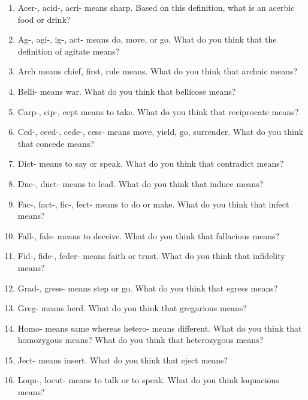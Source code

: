 \documentclass[12pt]{book}
\begin{document}
\begin{enumerate}
\item Acer-, acid-, acri- means sharp. Based on this definition, what is an acerbic food or drink?\\
\item Ag-, agi-, ig-, act- means do, move, or go. What do you think that the definition of agitate means?\\
\item Arch means chief, first, rule means. What do you think that archaic means?\\
\item Belli- means war. What do you think that bellicose means?\\
\item Carp-, cip-, cept means to take. What do you think that reciprocate means?\\
\item Ced-, ceed-, cede-, cess- means move, yield, go, surrender. What do you think that concede means?\\
\item Dict- means to say or speak. What do you think that contradict means?\\
\item Duc-, duct- means to lead. What do you think that induce means?\\
\item Fac-, fact-, fic-, fect- means to do or make. What do you think that infect means?\\ 
\item Fall-, fals- means to deceive. What do you think that fallacious means?\\
\item Fid-, fide-, feder- means faith or trust. What do you think that infidelity means?\\
\item Grad-, gress- means step or go. What do you think that egress means?\\
\item Greg- means herd. What do you think that gregarious means?\\
\item Homo- means same whereas hetero- means different. What do you think that homozygous means? What do you think that heterozygous means?\\
\item Ject- means insert. What do you think that eject means?\\
\item Loqu-, locut- means to talk or to speak. What do you think loquacious means?\\

\end{enumerate}
\end{document}
